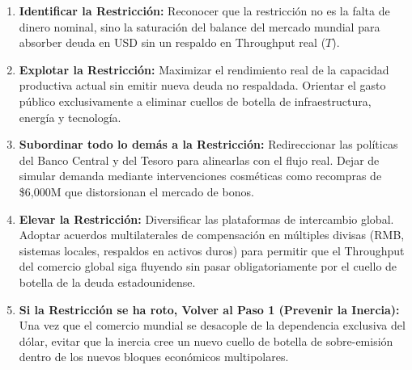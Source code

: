 \documentclass[12pt,letterpaper]{article}
\providecommand{\tightlist}{%
  \setlength{\itemsep}{0pt}\setlength{\parskip}{0pt}}
\begin{document}
\begin{enumerate}
\def\labelenumi{\arabic{enumi}.}
\tightlist
\item
  \textbf{Identificar la Restricción:} Reconocer que la restricción no
  es la falta de dinero nominal, sino la saturación del balance del
  mercado mundial para absorber deuda en USD sin un respaldo en
  Throughput real (\(T\)).
\item
  \textbf{Explotar la Restricción:} Maximizar el rendimiento real de la
  capacidad productiva actual sin emitir nueva deuda no respaldada.
  Orientar el gasto público exclusivamente a eliminar cuellos de botella
  de infraestructura, energía y tecnología.
\item
  \textbf{Subordinar todo lo demás a la Restricción:} Redireccionar las
  políticas del Banco Central y del Tesoro para alinearlas con el flujo
  real. Dejar de simular demanda mediante intervenciones cosméticas como
  recompras de \$6,000M que distorsionan el mercado de bonos.
\item
  \textbf{Elevar la Restricción:} Diversificar las plataformas de
  intercambio global. Adoptar acuerdos multilaterales de compensación en
  múltiples divisas (RMB, sistemas locales, respaldos en activos duros)
  para permitir que el Throughput del comercio global siga fluyendo sin
  pasar obligatoriamente por el cuello de botella de la deuda
  estadounidense.
\item
  \textbf{Si la Restricción se ha roto, Volver al Paso 1 (Prevenir la
  Inercia):} Una vez que el comercio mundial se desacople de la
  dependencia exclusiva del dólar, evitar que la inercia cree un nuevo
  cuello de botella de sobre-emisión dentro de los nuevos bloques
  económicos multipolares.
\end{enumerate}
\end{document}
